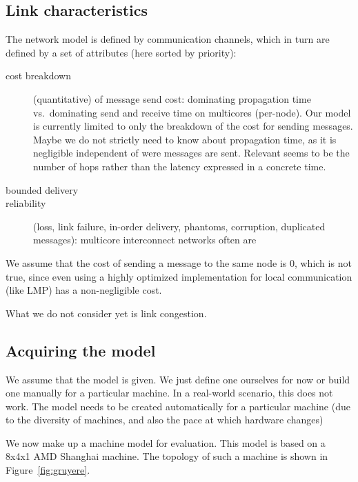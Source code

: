 \documentclass{article}
\begin{document}
\subsection{Link characteristics} 
\label{sec:model_links}

The network model is defined by communication channels, which in turn
are defined by a set of attributes (here sorted by priority):

\begin{description}
\item[cost breakdown] (quantitative) of message send cost:
  dominating propagation time vs.\ dominating send and receive time on
  multicores (per-node). Our model is currently limited to only the
  breakdown of the cost for sending messages. Maybe we do not strictly
  need to know about propagation time, as it is negligible independent
  of were messages are sent. Relevant seems to be the number of hops
  rather than the latency expressed in a concrete time.
\item[bounded delivery]
\item[reliability] (loss, link failure, in-order delivery, phantoms,
  corruption, duplicated messages): 
  multicore interconnect networks often are
\end{description}

We assume that the cost of sending a message to the same node is 0,
which is not true, since even using a highly optimized implementation
for local communication (like LMP) has a non-negligible cost.

What we do not consider yet is link congestion. 

\subsection{Acquiring the model}

We assume that the model is given. We just define one ourselves for
now or build one manually for a particular machine. In a real-world
scenario, this does not work. The model needs to be created
automatically for a particular machine (due to the diversity of
machines, and also the pace at which hardware changes)

We now make up a machine model for evaluation. This model is based on
a 8x4x1 AMD Shanghai machine. The topology of such a machine is shown
in Figure~\ref{fig:gruyere}.
\end{document}
